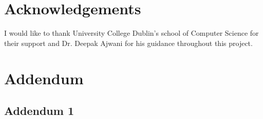 \documentclass[]{UCD_CS_FYP_Report}
\begin{document}
\chapter*{Acknowledgements}
I would like to thank University College Dublin’s school of Computer Science for their support and Dr. Deepak Ajwani for his guidance throughout this project.

\chapter{Addendum}
\section{Addendum 1}\label{addendum_1}
\begin{figure}[!h]
   \centering
   \hfill
   \hfill

\end{figure}
\end{document}
